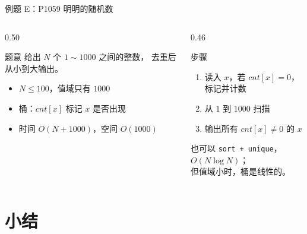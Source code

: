 \documentclass[aspectratio=169]{beamer}
\begin{document}
\begin{frame}{例题 E：P1059 明明的随机数}
    \begin{columns}[T]
        \begin{column}{0.50\textwidth}
            \small
            \begin{block}{题意}
                \footnotesize
                给出 $N$ 个 $1\sim1000$ 之间的整数，
                去重后从小到大输出。
            \end{block}
            \begin{itemize}
                \item $N\le 100$，值域只有 $1000$
                \item 桶：$cnt[x]$ 标记 $x$ 是否出现
                \item 时间 $O(N+1000)$，空间 $O(1000)$
            \end{itemize}
        \end{column}
        \begin{column}{0.46\textwidth}
            \begin{block}{步骤}
                \footnotesize
                \begin{enumerate}
                    \item 读入 $x$，若 $cnt[x]=0$，标记并计数
                    \item 从 $1$ 到 $1000$ 扫描
                    \item 输出所有 $cnt[x]\ne0$ 的 $x$
                \end{enumerate}
            \end{block}
            \vspace{0.4em}
            \footnotesize
            也可以 \texttt{sort + unique}，$O(N\log N)$；\\
            但值域小时，桶是线性的。
        \end{column}
    \end{columns}
\end{frame}

\section{小结}
\end{document}

